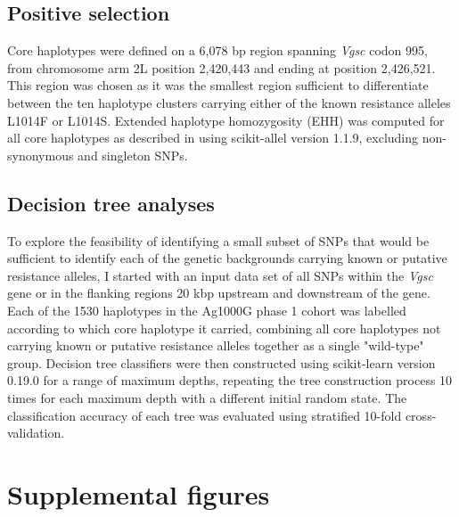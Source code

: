 \begin{refsection}
\subsection{Positive selection}\label{subsec:methods-selection}


Core haplotypes were defined on a 6,078 bp region spanning \textit{Vgsc} codon 995, from chromosome arm 2L position 2,420,443 and ending at position 2,426,521.
%
This region was chosen as it was the smallest region sufficient to differentiate between the ten haplotype clusters carrying either of the known resistance alleles L1014F or L1014S.
%
Extended haplotype homozygosity (EHH) was computed for all core haplotypes as described in \textcite{Sabeti2002} using scikit-allel version 1.1.9, excluding non-synonymous and singleton SNPs.


\subsection{Decision tree analyses}\label{subsec:methods-dts}


To explore the feasibility of identifying a small subset of SNPs that would be sufficient to identify each of the genetic backgrounds carrying known or putative resistance alleles, I started with an input data set of all SNPs within the \textit{Vgsc} gene or in the flanking regions 20 kbp upstream and downstream of the gene.
%
Each of the 1530 haplotypes in the Ag1000G phase 1 cohort was labelled according to which core haplotype it carried, combining all core haplotypes not carrying known or putative resistance alleles together as a single "wild-type" group.
%
Decision tree classifiers were then constructed using scikit-learn version 0.19.0 for a range of maximum depths, repeating the tree construction process 10 times for each maximum depth with a different initial random state.
%
The classification accuracy of each tree was evaluated using stratified 10-fold cross-validation.


\clearpage
\section{Supplemental figures}\label{sec:ch6-supplemental-figures}



\end{refsection}
